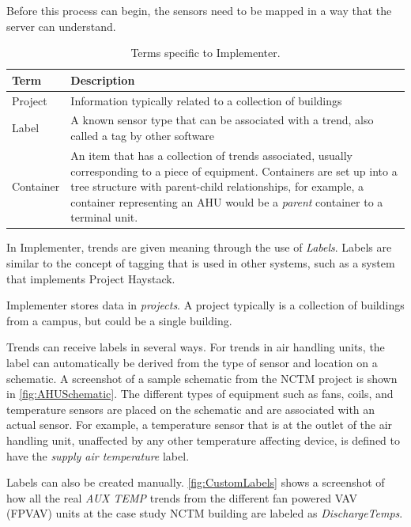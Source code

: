 Before this process can begin, the sensors need to be mapped in a
way that the server can understand. 

\begin{table}
\centering
\caption{Terms specific to Implementer.}
\label{tab:ImplementerTerms}

\begin{tabular}{lp{4.9in}}
\toprule
    Term    & Description                                                                                      \\  \midrule
    Project & Information typically related to a collection of buildings                                       \\
    Label   & A known sensor type that can be associated with a trend, also called a tag by other software     \\
 Container  & An item that has a collection of trends associated,
 usually corresponding to a piece of equipment. Containers are set up into a tree
 structure with parent-child relationships, for example, a container
 representing an AHU would be a \textit{parent} container to a terminal
 unit. \\ \bottomrule
\end{tabular}

\end{table}

In Implementer, trends are given meaning through the use of
\textit{Labels}. Labels are similar to the concept of tagging that is used
in other systems, such as a system that implements Project Haystack. 

Implementer stores data in \textit{projects}. A project typically is a
collection of buildings from a campus, but could be a single building. 

Trends can receive labels in several ways. For trends in air handling
units, the label can automatically be derived from the type of sensor
and location on a schematic. A screenshot of a sample schematic from the
NCTM project is shown in \figref{} \ref{fig:AHUSchematic}. The different
types of equipment such as fans, coils, and temperature sensors are
placed on the schematic and are associated with an actual sensor. For
example, a temperature sensor that is at the outlet of the air handling
unit, unaffected by any other temperature affecting device, is defined
to have the \textit{supply air temperature} label. 

Labels can also be created manually. \figref{} \ref{fig:CustomLabels}
shows a screenshot of how all the real \textit{AUX TEMP} trends from the
different fan powered VAV (FPVAV) units at the case study NCTM building
are labeled as \textit{DischargeTemps}.

